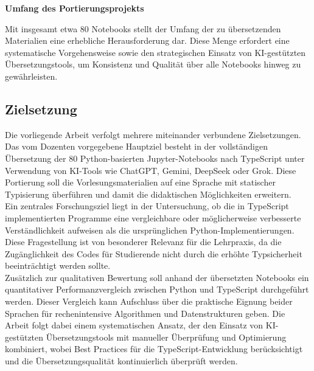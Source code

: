 \textbf{Umfang des Portierungsprojekts}
\begin{description}[style=nextline, leftmargin=1cm, labelsep=1em]
	\item Mit insgesamt etwa 80 Notebooks stellt der Umfang der zu übersetzenden Materialien eine erhebliche Herausforderung dar. Diese Menge erfordert eine systematische Vorgehensweise sowie den strategischen Einsatz von \acs{KI}-gestützten Übersetzungstools, um Konsistenz und Qualität über alle Notebooks hinweg zu gewährleisten.
\end{description}
\subsection{Zielsetzung}
Die vorliegende Arbeit verfolgt mehrere miteinander verbundene Zielsetzungen. Das vom Dozenten vorgegebene Hauptziel besteht in der vollständigen Übersetzung der 80 Python-basierten Jupyter-Notebooks nach TypeScript unter Verwendung von \ac{KI}-Tools wie ChatGPT, Gemini, DeepSeek oder Grok. Diese Portierung soll die Vorlesungsmaterialien auf eine Sprache mit statischer Typisierung überführen und damit die didaktischen Möglichkeiten erweitern. \\
Ein zentrales Forschungsziel liegt in der Untersuchung, ob die in TypeScript implementierten Programme eine vergleichbare oder möglicherweise verbesserte Verständlichkeit aufweisen als die ursprünglichen Python-Implementierungen. Diese Fragestellung ist von besonderer Relevanz für die Lehrpraxis, da die Zugänglichkeit des Codes für Studierende nicht durch die erhöhte Typsicherheit beeinträchtigt werden sollte. \\
Zusätzlich zur qualitativen Bewertung soll anhand der übersetzten Notebooks ein quantitativer Performanzvergleich zwischen Python und TypeScript durchgeführt werden. Dieser Vergleich kann Aufschluss über die praktische Eignung beider Sprachen für rechenintensive Algorithmen und Datenstrukturen geben. Die Arbeit folgt dabei einem systematischen Ansatz, der den Einsatz von \ac{KI}-gestützten Übersetzungstools mit manueller Überprüfung und Optimierung kombiniert, wobei Best Practices für die TypeScript-Entwicklung berücksichtigt und die Übersetzungsqualität kontinuierlich überprüft werden.


